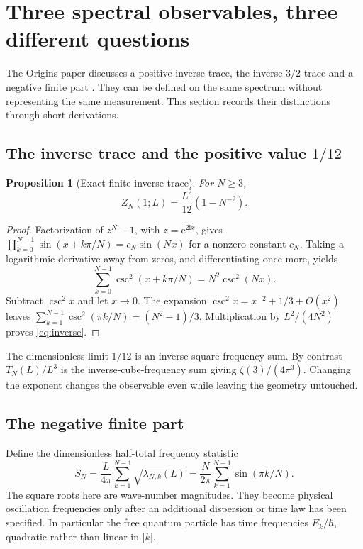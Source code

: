 \documentclass[11pt,a4paper]{article}
\newtheorem{proposition}[theorem]{Proposition}
\theoremstyle{definition}\newtheorem{definition}[theorem]{Definition}
\theoremstyle{remark}\newtheorem{remark}[theorem]{Remark}
\newcommand{\ee}{\mathrm e}\newcommand{\ii}{\mathrm i}
\numberwithin{equation}{section}
\begin{document}
\section{Three spectral observables, three different questions}\label{sec:observables}
The Origins paper discusses a positive inverse trace, the inverse
\(3/2\) trace and a negative finite part \cite[section 5]{origins}.
They can be defined on the same spectrum without representing the same
measurement. This section records their distinctions through short
derivations.

\subsection{The inverse trace and the positive value \(1/12\)}
\begin{proposition}[Exact finite inverse trace]\label{prop:inverse}
For \(N\geq3\),
\begin{equation}
 Z_N(1;L)=\frac{L^2}{12}(1-N^{-2}).
 \label{eq:inverse}
\end{equation}
\end{proposition}
\begin{proof}
Factorization of \(z^N-1\), with \(z=\ee^{2\ii x}\), gives
\(\prod_{k=0}^{N-1}\sin(x+k\pi/N)=c_N\sin(Nx)\)
for a nonzero constant \(c_N\). Taking a logarithmic derivative away
from zeros, and differentiating once more, yields
\[
 \sum_{k=0}^{N-1}\csc^2(x+k\pi/N)=N^2\csc^2(Nx).
\]
Subtract \(\csc^2x\) and let \(x\to0\).
The expansion \(\csc^2x=x^{-2}+1/3+O(x^2)\) leaves
\(\sum_{k=1}^{N-1}\csc^2(\pi k/N)=(N^2-1)/3\).
Multiplication by \(L^2/(4N^2)\) proves \eqref{eq:inverse}.
\end{proof}

The dimensionless limit \(1/12\) is an inverse-square-frequency sum.
By contrast \(T_N(L)/L^3\) is the inverse-cube-frequency sum giving
\(\zeta(3)/(4\pi^3)\). Changing the exponent changes the observable
even while leaving the geometry untouched.

\subsection{The negative finite part}
Define the dimensionless half-total frequency statistic
\begin{equation}
 S_N=\frac{L}{4\pi}\sum_{k=1}^{N-1}\sqrt{\lambda_{N,k}(L)}
     =\frac N{2\pi}\sum_{k=1}^{N-1}\sin(\pi k/N).
 \label{eq:freq}
\end{equation}
The square roots here are wave-number magnitudes. They become physical
oscillation frequencies only after an additional dispersion or time law
has been specified. In particular the free quantum particle has time
frequencies \(E_k/\hbar\), quadratic rather than linear in \(|k|\).
\end{document}
